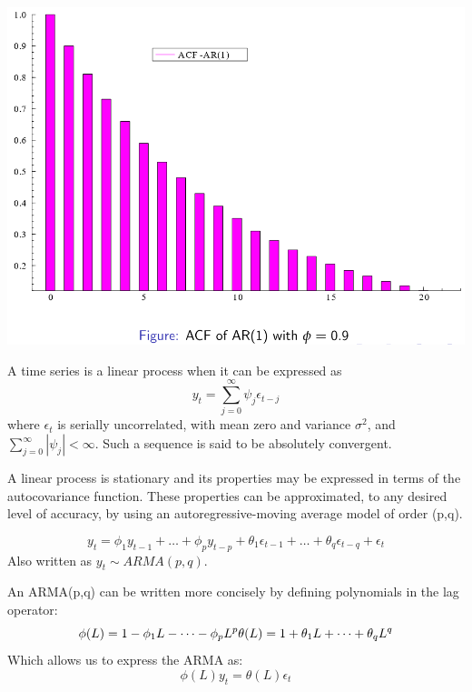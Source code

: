 \documentclass[DIV=14,titlepage=false]{scrreprt}
\begin{document}
\includegraphics[width=\textwidth]{./Images/AR(1)-ACF.png}
\begin{definition}
A time series is a linear process when it can be expressed as \[
    y_t = \sum_{j= 0}^{\infty} \psi_j \epsilon_{t-j}
    \]
    where $\epsilon_t$ is serially uncorrelated, with mean zero and variance $\sigma^2$, and $\sum_{j=0}^{\infty} |\psi_j| < \infty$. Such a sequence is said to be absolutely convergent.
\end{definition}
A linear process is stationary and its properties may be expressed in terms of the autocovariance function. These properties can be approximated, to any desired level of accuracy, by using an autoregressive-moving average model of order (p,q).
\begin{definition}
\[ y_t = \phi_1 y_{t-1} + \dots + \phi_p y_{t-p} + \theta_1 \epsilon_{t-1} + \dots + \theta_q \epsilon_{t-q} + \epsilon_t \] Also written as $y_t \sim ARMA(p,q)$.
\end{definition}
An ARMA(p,q) can be written more concisely by defining polynomials in the lag operator:
\[
    \phi (L) = 1 - \phi_1 L - \dots - \phi_p L^p\\
    \theta (L) = 1 + \theta_1 L + \dots + \theta_q L^q
\]
Which allows us to express the ARMA as:
\[
    \phi (L) y_t = \theta (L) \epsilon_t
\]
\end{document}
